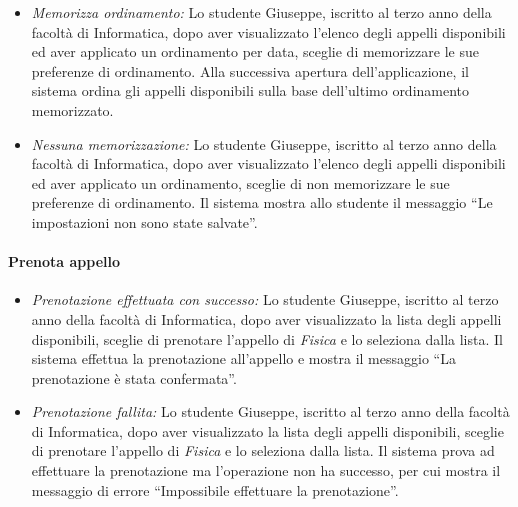 \begin{itemize}
	\item \textit{Memorizza ordinamento:}
	Lo studente Giuseppe, iscritto al terzo anno della facoltà di Informatica, dopo aver visualizzato l’elenco degli appelli disponibili ed aver applicato un ordinamento per data, sceglie di memorizzare le sue preferenze di ordinamento. Alla successiva apertura dell’applicazione, il sistema ordina gli appelli disponibili sulla base dell'ultimo ordinamento memorizzato.
	
	\item \textit{Nessuna memorizzazione:}
	Lo studente Giuseppe, iscritto al terzo anno della facoltà di Informatica, dopo aver visualizzato l’elenco degli appelli disponibili ed aver applicato un ordinamento, sceglie di non memorizzare le sue preferenze di ordinamento. Il sistema mostra allo studente il messaggio “Le impostazioni non sono state salvate”.
\end{itemize}

\paragraph{Prenota appello}
\begin{itemize}
	\item \textit{Prenotazione effettuata con successo:}
	Lo studente Giuseppe, iscritto al terzo anno della facoltà di Informatica, dopo aver visualizzato la lista degli appelli disponibili, sceglie di prenotare l’appello di \textit{Fisica} e lo seleziona dalla lista. Il sistema effettua la prenotazione all’appello e mostra il messaggio “La prenotazione è stata confermata”.
	
	\item \textit{Prenotazione fallita:}
	Lo studente Giuseppe, iscritto al terzo anno della facoltà di Informatica, dopo aver visualizzato la lista degli appelli disponibili, sceglie di prenotare l’appello di \textit{Fisica} e lo seleziona dalla lista. Il sistema prova ad effettuare la prenotazione ma l’operazione non ha successo, per cui mostra il messaggio di errore “Impossibile effettuare la prenotazione”.
\end{itemize}

